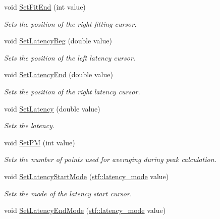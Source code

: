 \begin{DoxyCompactItemize}
void \hyperlink{classRecording_ae726f0e80ac5025546ab8a3939c58c76}{SetFitEnd} (int value)
\begin{DoxyCompactList}\small\item\em Sets the position of the right fitting cursor. \item\end{DoxyCompactList}\item 
void \hyperlink{classRecording_a272e721981d1857add9d85c3b4e77021}{SetLatencyBeg} (double value)
\begin{DoxyCompactList}\small\item\em Sets the position of the left latency cursor. \item\end{DoxyCompactList}\item 
void \hyperlink{classRecording_a68fb8d26636c4f9047e439dd1cddd11c}{SetLatencyEnd} (double value)
\begin{DoxyCompactList}\small\item\em Sets the position of the right latency cursor. \item\end{DoxyCompactList}\item 
void \hyperlink{classRecording_a0f432f00647509c5d2351fe793ec3dab}{SetLatency} (double value)
\begin{DoxyCompactList}\small\item\em Sets the latency. \item\end{DoxyCompactList}\item 
void \hyperlink{classRecording_af7d4304fe4f8555df1bbee68afdff55f}{SetPM} (int value)
\begin{DoxyCompactList}\small\item\em Sets the number of points used for averaging during peak calculation. \item\end{DoxyCompactList}\item 
void \hyperlink{classRecording_af3414d6ed7bc2dc5000b2e2f59e4cb8b}{SetLatencyStartMode} (\hyperlink{group__stfgen_ga738f9934a45a9d2d81cb0a3de0375c99}{stf::latency\_\-mode} value)
\begin{DoxyCompactList}\small\item\em Sets the mode of the latency start cursor. \item\end{DoxyCompactList}\item 
void \hyperlink{classRecording_a38e51b04f3cc725d484e589b6070e255}{SetLatencyEndMode} (\hyperlink{group__stfgen_ga738f9934a45a9d2d81cb0a3de0375c99}{stf::latency\_\-mode} value)

\end{DoxyCompactItemize}
